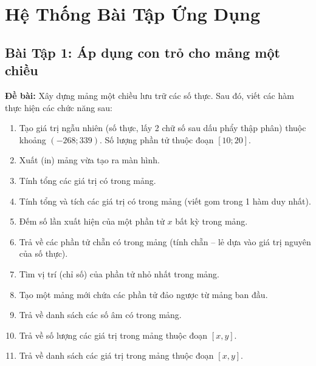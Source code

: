 \documentclass[12pt,a4paper]{article}
\begin{document}
\section{Hệ Thống Bài Tập Ứng Dụng}

\subsection{Bài Tập 1: Áp dụng con trỏ cho mảng một chiều}
\textbf{Đề bài:} Xây dựng mảng một chiều lưu trữ các số thực. Sau đó, viết các hàm thực hiện các chức năng sau:
\begin{enumerate}[itemsep=0.15em]
    \item Tạo giá trị ngẫu nhiên (số thực, lấy 2 chữ số sau dấu phẩy thập phân) thuộc khoảng $(-268; 339)$. Số lượng phần tử thuộc đoạn $[10; 20]$.
    \item Xuất (in) mảng vừa tạo ra màn hình.
    \item Tính tổng các giá trị có trong mảng.
    \item Tính tổng và tích các giá trị có trong mảng (viết gom trong 1 hàm duy nhất).
    \item Đếm số lần xuất hiện của một phần tử $x$ bất kỳ trong mảng.
    \item Trả về các phần tử chẵn có trong mảng (tính chẵn -- lẻ dựa vào giá trị nguyên của số thực).
    \item Tìm vị trí (chỉ số) của phần tử nhỏ nhất trong mảng.
    \item Tạo một mảng mới chứa các phần tử đảo ngược từ mảng ban đầu.
    \item Trả về danh sách các số âm có trong mảng.
    \item Trả về số lượng các giá trị trong mảng thuộc đoạn $[x, y]$.
    \item Trả về danh sách các giá trị trong mảng thuộc đoạn $[x, y]$.
\end{enumerate}
\end{document}
